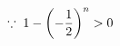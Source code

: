 \documentclass[preview]{standalone}
\begin{document}
\begin{align*}
\special{dvisvgm:raw <g id='unique000'>}\because\; 1-\left(-\frac{1}{2}\right)^n>0\special{dvisvgm:raw </g>}
\end{align*}
\end{document}
